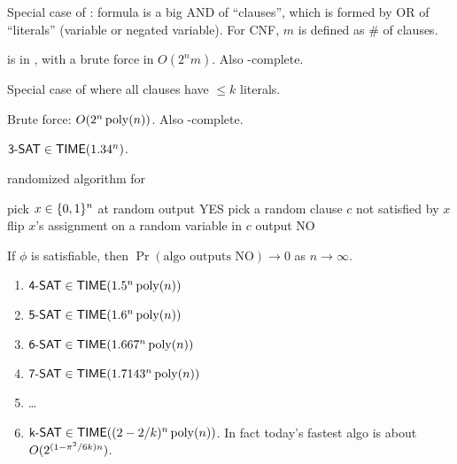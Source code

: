 \documentclass{article}
\begin{document}
\begin{definition}
  Special case of : formula is a big AND of ``clauses'', which is formed by OR of ``literals'' (variable or negated variable). For CNF, \(m\) is defined as \# of clauses.
\end{definition}

 is in \EXP, with a brute force in \(O(2^n m)\). Also \NP-complete.

\begin{definition}
  Special case of  where all clauses have \(\leq k\) literals.
\end{definition}

Brute force: \(O(2^n \operatorname{poly}(n))\). Also \NP-complete.

\begin{theorem}[Sch '99, MS '10]
  \( \text{\sf 3-SAT} \in \text{\sf TIME}(1.34^n) \).
\end{theorem}

\begin{algorithm}[h]
  \caption{randomized algorithm for }
  \begin{algorithmic}[1]
        \State pick \(x \in \lbrace0, 1\rbrace^n\) at random
            \State output YES
          \Else
            \State pick a random clause \(c\) not satisfied by \(x\)
            \State flip \(x\)'s assignment on a random variable in \(c\)
          \EndIf
        \EndFor
      \EndFor
      \State output NO
    \EndProcedure
  \end{algorithmic}
\end{algorithm}

\newpage
\begin{theorem}
  If \(\phi\) is satisfiable, then \(\Pr(\text{algo outputs NO}) \to 0\) as \(n \to \infty\).
\end{theorem}

\begin{enumerate}
  \item \( \text{\sf 4-SAT} \in \text{\sf TIME}(1.5^n \operatorname{poly}(n)) \)
  \item \( \text{\sf 5-SAT} \in \text{\sf TIME}(1.6^n \operatorname{poly}(n)) \)
  \item \( \text{\sf 6-SAT} \in \text{\sf TIME}(1.667^n \operatorname{poly}(n)) \)
  \item \( \text{\sf 7-SAT} \in \text{\sf TIME}(1.7143^n \operatorname{poly}(n)) \)
  \item \ldots
  \item \( \text{\sf k-SAT} \in \text{\sf TIME}((2 - 2/k)^n \operatorname{poly}(n)) \). In fact today's fastest algo is about \(O\lparen2^{(1 - \pi^2/6k) n}\rparen\).
\end{enumerate}
\end{document}
